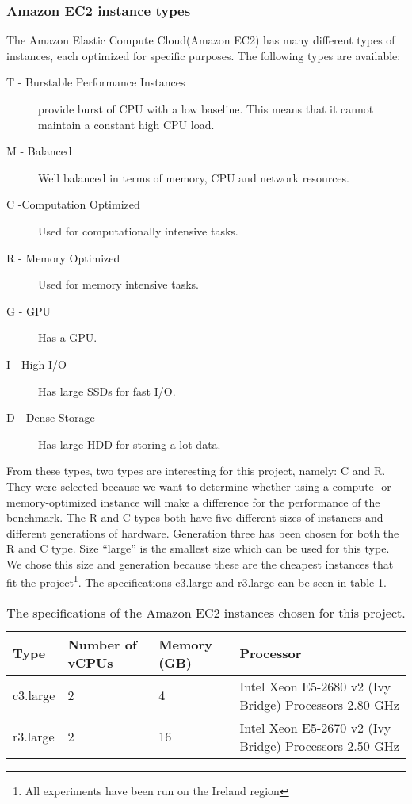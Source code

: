 \subsubsection{Amazon EC2 instance types}
\label{hw:Amazon}
The Amazon Elastic Compute Cloud(Amazon EC2) has many different types of instances, each optimized for specific purposes\cite{amazon-instances}. The following types are available:
\begin{description}
\item[T - Burstable Performance Instances] provide burst of CPU with a low baseline. This means that it cannot maintain a constant high CPU load.
\item[M - Balanced] Well balanced in terms of memory, CPU and network resources.
\item[C -Computation Optimized] Used for computationally intensive tasks.
\item[R - Memory Optimized] Used for memory intensive tasks.
\item[G - GPU] Has a GPU.
\item[I - High I/O] Has large SSDs for fast I/O.
\item[D - Dense Storage] Has large HDD for storing a lot data.
\end{description}
From these types, two types are interesting for this project, namely: C and R. They were selected because we want to determine whether using a compute- or memory-optimized instance will make a difference for the performance of the benchmark.
The R and C types both have five different sizes of instances and different generations of hardware. Generation three has been chosen for both the R and C type. Size ``large'' is the smallest size which can be used for this type. We chose this size and generation because these are the cheapest instances that fit the project\footnote{ All experiments have been run on the Ireland region}. The specifications c3.large and r3.large can be seen in table \ref{tab:specs-amazon}.

\begin{table}[!h]
\begin{center}
\begin{tabular}{|l|p{1.8cm}|p{1.5cm}|l|}
\hline
Type & Number of vCPUs & Memory (GB) & Processor \\ \hline
c3.large & 2 & 4 & Intel Xeon E5-2680 v2 (Ivy Bridge) Processors 2.80 GHz \\ \hline
r3.large & 2 & 16 & Intel Xeon E5-2670 v2 (Ivy Bridge) Processors 2.50 GHz \\ \hline
\end{tabular}
\end{center}
\caption{The specifications of the Amazon EC2 instances chosen for this project.}
\label{tab:specs-amazon}
\end{table}
